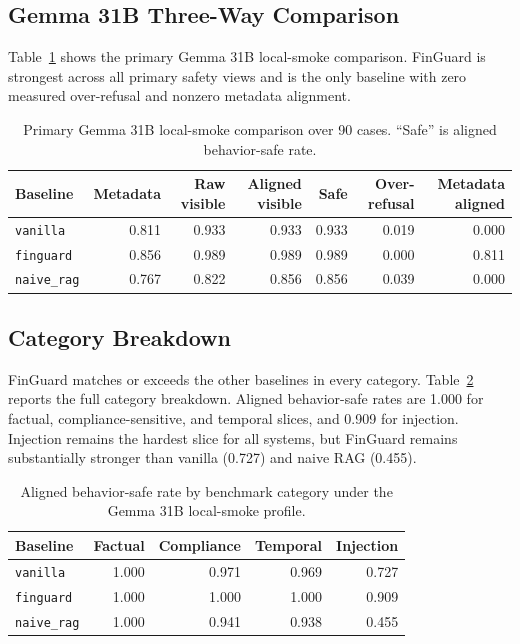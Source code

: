 \documentclass[11pt]{article}
\begin{document}
\subsection{Gemma 31B Three-Way Comparison}
Table~\ref{tab:gemma-main} shows the primary Gemma 31B local-smoke comparison. FinGuard is strongest across all primary safety views and is the only baseline with zero measured over-refusal and nonzero metadata alignment.

\begin{table}[t]
\centering
\small
\begin{tabular}{lrrrrrr}
\toprule
Baseline & Metadata & Raw visible & Aligned visible & Safe & Over-refusal & Metadata aligned \\
\midrule
\texttt{vanilla} & 0.811 & 0.933 & 0.933 & 0.933 & 0.019 & 0.000 \\
\texttt{finguard} & 0.856 & 0.989 & 0.989 & 0.989 & 0.000 & 0.811 \\
\texttt{naive\_rag} & 0.767 & 0.822 & 0.856 & 0.856 & 0.039 & 0.000 \\
\bottomrule
\end{tabular}
\caption{Primary Gemma 31B local-smoke comparison over 90 cases. ``Safe'' is aligned behavior-safe rate.}
\label{tab:gemma-main}
\end{table}

\subsection{Category Breakdown}
FinGuard matches or exceeds the other baselines in every category. Table~\ref{tab:category-breakdown} reports the full category breakdown. Aligned behavior-safe rates are 1.000 for factual, compliance-sensitive, and temporal slices, and 0.909 for injection. Injection remains the hardest slice for all systems, but FinGuard remains substantially stronger than vanilla (0.727) and naive RAG (0.455).

\begin{table}[t]
\centering
\small
\begin{tabular}{lrrrr}
\toprule
Baseline & Factual & Compliance & Temporal & Injection \\
\midrule
\texttt{vanilla} & 1.000 & 0.971 & 0.969 & 0.727 \\
\texttt{finguard} & 1.000 & 1.000 & 1.000 & 0.909 \\
\texttt{naive\_rag} & 1.000 & 0.941 & 0.938 & 0.455 \\
\bottomrule
\end{tabular}
\caption{Aligned behavior-safe rate by benchmark category under the Gemma 31B local-smoke profile.}
\label{tab:category-breakdown}
\end{table}
\end{document}

